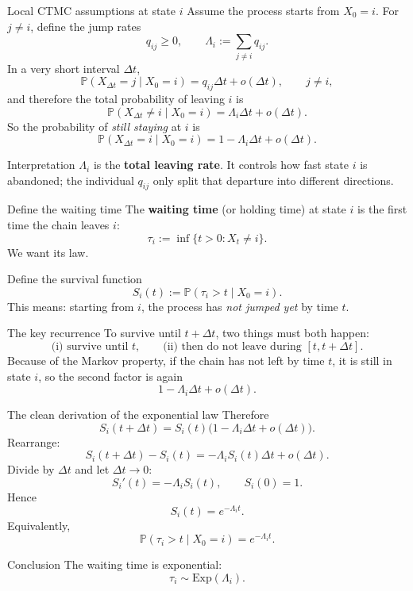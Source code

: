 \documentclass[aspectratio=169,professionalfonts]{beamer}
\newcommand{\Prob}{\mathbb{P}}
\begin{document}
\begin{frame}{Local CTMC assumptions at state $i$}
Assume the process starts from $X_0=i$. For $j\neq i$, define the jump rates
\[
q_{ij}\ge 0,
\qquad
\Lambda_i:=\sum_{j\neq i} q_{ij}.
\]
In a very short interval $\Delta t$,
\[
\Prob(X_{\Delta t}=j\mid X_0=i)=q_{ij}\Delta t+o(\Delta t),\qquad j\neq i,
\]
and therefore the total probability of leaving $i$ is
\[
\Prob(X_{\Delta t}\neq i\mid X_0=i)=\Lambda_i\Delta t+o(\Delta t).
\]
So the probability of \emph{still staying} at $i$ is
\[
\Prob(X_{\Delta t}=i\mid X_0=i)=1-\Lambda_i\Delta t+o(\Delta t).
\]

\begin{alertblock}{Interpretation}
$\Lambda_i$ is the \textbf{total leaving rate}. It controls how fast state $i$ is abandoned; the individual $q_{ij}$ only split that departure into different directions.
\end{alertblock}
\end{frame}

\begin{frame}{Define the waiting time}
The \textbf{waiting time} (or holding time) at state $i$ is the first time the chain leaves $i$:
\[
\tau_i:=\inf\{t>0: X_t\neq i\}.
\]
We want its law.

\vspace{0.2cm}
Define the survival function
\[
S_i(t):=\Prob(\tau_i>t\mid X_0=i).
\]
This means: starting from $i$, the process has \emph{not jumped yet} by time $t$.

\begin{block}{The key recurrence}
To survive until $t+\Delta t$, two things must both happen:
\[
\text{(i) survive until }t,\qquad \text{(ii) then do not leave during }[t,t+\Delta t].
\]
Because of the Markov property, if the chain has not left by time $t$, it is still in state $i$, so the second factor is again
\[
1-\Lambda_i\Delta t+o(\Delta t).
\]
\end{block}
\end{frame}

\begin{frame}{The clean derivation of the exponential law}
Therefore
\[
S_i(t+\Delta t)=S_i(t)\bigl(1-\Lambda_i\Delta t+o(\Delta t)\bigr).
\]
Rearrange:
\[
S_i(t+\Delta t)-S_i(t)=-\Lambda_i S_i(t)\Delta t+o(\Delta t).
\]
Divide by $\Delta t$ and let $\Delta t\to 0$:
\[
S_i'(t)=-\Lambda_i S_i(t),
\qquad
S_i(0)=1.
\]
Hence
\[
S_i(t)=e^{-\Lambda_i t}.
\]
Equivalently,
\[
\Prob(\tau_i>t\mid X_0=i)=e^{-\Lambda_i t}.
\]

\begin{alertblock}{Conclusion}
The waiting time is exponential:
\[
\tau_i\sim \mathrm{Exp}(\Lambda_i).
\]
\end{alertblock}
\end{frame}
\end{document}
